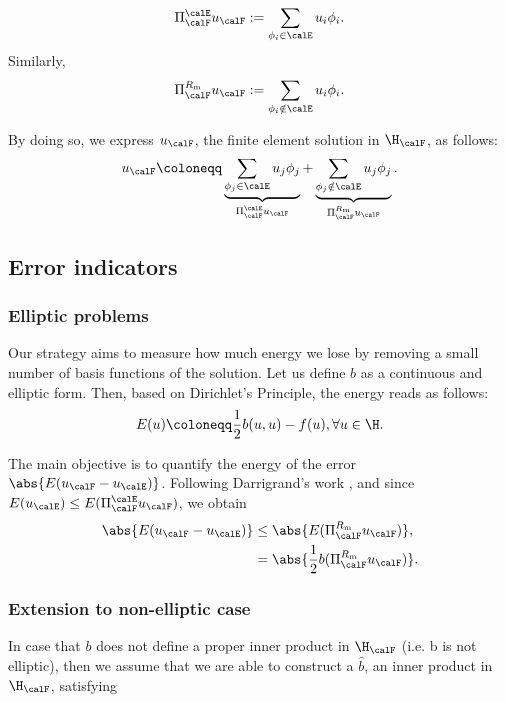 \begin{equation}
  \Pi_{\calF}^{\calE} u_{\calF} := \sum_{\phi_{i} \in \calE} u_{i} \phi_{i}.
\end{equation}
Similarly,
\begin{equation}
  \Pi_{\calF}^{R_{\textrm{m}}} u_{\calF} := \sum_{\phi_{i} \notin \calE} u_{i} \phi_{i}.
\end{equation}

\noindent By doing so, we express $u_{\calF}$, the finite element solution in $\H_{\calF}$, as follows:
\begin{equation}
  u_{\calF} \coloneqq  \underbrace{\sum_{\phi_{j} \in \calE} u_{j} \phi_{j}}_{\Pi_{\calF}^{\calE} u_{\calF}} + \underbrace{\sum_{\phi_{j} \notin \calE} u_{ j} \phi_{j}}_{\Pi_{\calF}^{R_{\textrm{m}}} u_{\calF}}.
\end{equation}

\subsection{Error indicators}
\subsubsection{Elliptic problems}
Our strategy aims to measure how much energy we lose by removing a small number of basis functions of the solution. Let us define $b$ as a continuous and elliptic form. Then, based on Dirichlet's Principle, the energy reads as follows:
\begin{equation}
  \label{eq:energy}
  E(u) \coloneqq \frac{1}{2} b(u, u) - f(u), \forall u \in \H.
\end{equation}

The main objective is to quantify the energy of the error $\abs{E(u_{\calF} - u_{\calE})}$. Following Darrigrand's work \cite{darrigrand2020painless}, and since $E(u_{\calE}) \leq E(\Pi_{\calF}^{\calE} u_{\calF})$, we obtain
\begin{align}
  \abs{E(u_{\calF} - u_{\calE})} & \leq \abs{E(\Pi_{\calF}^{R_{\textrm{m}}} u_{\calF})},          \\
                                 & = \abs{\frac{1}{2} b(\Pi_{\calF}^{R_{\textrm{m}}} u_{\calF})}.
\end{align}

\subsubsection{Extension to non-elliptic  case}
In case that $b$ does not define a proper inner product in $\H_{\calF}$ (i.e. b is not elliptic), then we assume that we are able to construct a $\hat{b}$, an inner product in $\H_{\calF}$, satisfying


